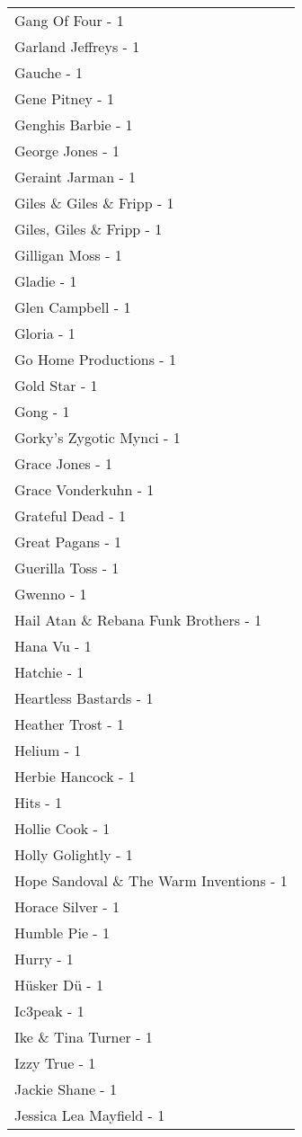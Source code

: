 \documentclass[
]{article}
\begin{document}
\begin{longtable}{l}
Gang Of Four - 1 \\ 
Garland Jeffreys - 1 \\ 
Gauche - 1 \\ 
Gene Pitney - 1 \\ 
Genghis Barbie - 1 \\ 
George Jones - 1 \\ 
Geraint Jarman - 1 \\ 
Giles \& Giles \& Fripp - 1 \\ 
Giles, Giles \& Fripp - 1 \\ 
Gilligan Moss - 1 \\ 
Gladie - 1 \\ 
Glen Campbell - 1 \\ 
Gloria - 1 \\ 
Go Home Productions - 1 \\ 
Gold Star - 1 \\ 
Gong - 1 \\ 
Gorky's Zygotic Mynci - 1 \\ 
Grace Jones - 1 \\ 
Grace Vonderkuhn - 1 \\ 
Grateful Dead - 1 \\ 
Great Pagans - 1 \\ 
Guerilla Toss - 1 \\ 
Gwenno - 1 \\ 
Hail Atan \& Rebana Funk Brothers - 1 \\ 
Hana Vu - 1 \\ 
Hatchie - 1 \\ 
Heartless Bastards - 1 \\ 
Heather Trost - 1 \\ 
Helium - 1 \\ 
Herbie Hancock - 1 \\ 
Hits - 1 \\ 
Hollie Cook - 1 \\ 
Holly Golightly - 1 \\ 
Hope Sandoval \& The Warm Inventions - 1 \\ 
Horace Silver - 1 \\ 
Humble Pie - 1 \\ 
Hurry - 1 \\ 
Hüsker Dü - 1 \\ 
Ic3peak - 1 \\ 
Ike \& Tina Turner - 1 \\ 
Izzy True - 1 \\ 
Jackie Shane - 1 \\ 
Jessica Lea Mayfield - 1 \\ 

\end{longtable}
\end{document}
